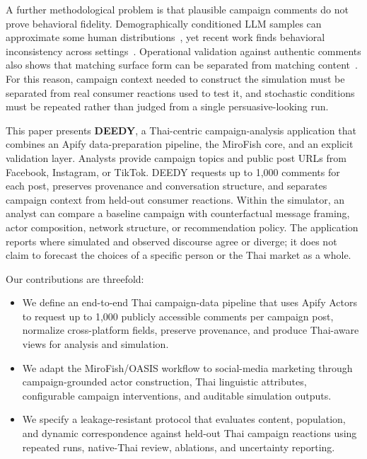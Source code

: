\documentclass[conference]{IEEEtran}
\begin{document}
A further methodological problem is that plausible campaign comments do not
prove behavioral fidelity. Demographically conditioned LLM samples can
approximate some human distributions~\cite{argyle2023out}, yet recent work finds
behavioral inconsistency across settings~\cite{mooney2025coherent}. Operational
validation against authentic comments also shows that matching surface form
can be separated from matching content~\cite{schwager2026conditioned}. For this
reason, campaign context needed to construct the simulation must be separated
from real consumer reactions used to test it, and stochastic conditions must
be repeated rather than judged from a single persuasive-looking run.

This paper presents \textbf{DEEDY}, a Thai-centric campaign-analysis
application that combines an Apify data-preparation pipeline, the MiroFish core,
and an explicit validation layer. Analysts provide campaign topics and public
post URLs from Facebook, Instagram, or TikTok. DEEDY requests up to 1,000
comments for each post, preserves provenance and conversation structure, and
separates campaign context from held-out consumer reactions. Within the
simulator, an analyst can compare a baseline campaign with counterfactual
message framing, actor composition, network structure, or recommendation
policy. The application reports where simulated and observed discourse agree
or diverge; it does not claim to forecast the choices of a specific person or
the Thai market as a whole.

Our contributions are threefold:
\begin{itemize}
    \item We define an end-to-end Thai campaign-data pipeline that uses Apify
    Actors to request up to 1,000 publicly accessible comments per campaign
    post, normalize cross-platform fields, preserve provenance, and produce
    Thai-aware views for analysis and simulation.
    \item We adapt the MiroFish/OASIS workflow to social-media marketing through
    campaign-grounded actor construction, Thai linguistic attributes,
    configurable campaign interventions, and auditable simulation outputs.
    \item We specify a leakage-resistant protocol that evaluates content,
    population, and dynamic correspondence against held-out Thai campaign
    reactions using repeated runs, native-Thai review, ablations, and
    uncertainty reporting.
\end{itemize}
\end{document}
